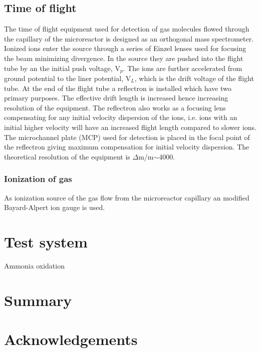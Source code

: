 \documentclass[12pt]{article}
\begin{document}
\subsection{Time of flight}
The time of flight equipment used for detection of gas molecules flowed through the capillary of the microreactor is designed as an orthogonal mass spectrometer. Ionized ions enter the source through a series of Einzel lenses used for focusing the beam minimizing divergence. In the source they are pushed into the flight tube by an the initial push voltage, V$_p$. The ions are further accelerated from ground potential to the liner potential, V$_L$, which is the drift voltage of the flight tube. At the end of the flight tube a reflectron is installed which have two primary purposes. The effective drift length is increased hence increasing resolution of the equipment. The reflectron also works as a focusing lens compensating for any initial velocity dispersion of the ions, i.e. ions with an initial higher velocity will have an increased flight length compared to slower ions. The microchannel plate (MCP) used for detection is placed in the focal point of the reflectron giving maximum compensation for initial velocity dispersion. The theoretical resolution of the equipment is $\Delta$m/m$\sim$4000.

\subsubsection{Ionization of gas}
As ionization source of the gas flow from the microreactor capillary an modified Bayard-Alpert ion gauge is used. 

\section{Test system}
Ammonia oxidation

\section{Summary}

\section{Acknowledgements}



\end{document}
